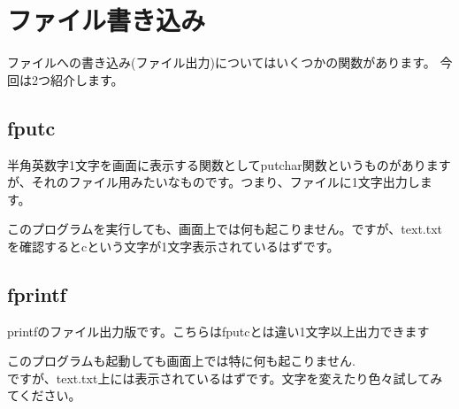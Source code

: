\section{ファイル書き込み}
ファイルへの書き込み(ファイル出力)についてはいくつかの関数があります。
今回は2つ紹介します。

\subsection{fputc}
半角英数字1文字を画面に表示する関数としてputchar関数というものがありますが、それのファイル用みたいなものです。つまり、ファイルに1文字出力します。



このプログラムを実行しても、画面上では何も起こりません。ですが、text.txtを確認するとcという文字が1文字表示されているはずです。

\subsection{fprintf}
printfのファイル出力版です。こちらはfputcとは違い1文字以上出力できます



このプログラムも起動しても画面上では特に何も起こりません.\\
ですが、text.txt上には表示されているはずです。文字を変えたり色々試してみてください。
